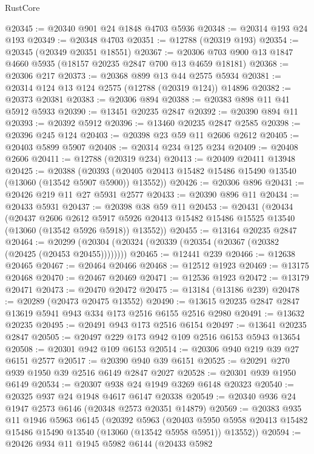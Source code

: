 \begin{lexlean}{RustCore}
\begin{coremodule}
@20345 := @20340 @901 @24 @1848 @4703 @5936
@20348 := @20314 @193 @24 @193
@20349 := @20348 @4703
@20351 := @12788 (@20319 @193)
@20354 := @20345 (@20349 @20351 @18551)
@20367 := @20306 @703 @900 @13 @1847 @4660 @5935 (@18157 @20235 @2847 @700 @13 @4659 @18181)
@20368 := @20306 @217
@20373 := @20368 @899 @13 @44 @2575 @5934
@20381 := @20314 @124 @13 @124 @2575 (@12788 (@20319 @124)) @14896
@20382 := @20373 @20381
@20383 := @20306 @894
@20388 := @20383 @898 @11 @41 @5912 @5933
@20390 := @13451 @20235 @2847
@20392 := @20390 @894 @11
@20393 := @20392 @5912
@20396 := @13460 @20235 @2847 @2585
@20398 := @20396 @245 @124
@20403 := @20398 @23 @59 @11 @2606 @2612
@20405 := @20403 @5899 @5907
@20408 := @20314 @234 @125 @234
@20409 := @20408 @2606
@20411 := @12788 (@20319 @234)
@20413 := @20409 @20411 @13948
@20425 := @20388
    (@20393 (@20405 @20413 @15482 @15486 @15490 @13540 (@13060 (@13542 @5907 @5900)) @13552))
@20426 := @20306 @896
@20431 := @20426 @219 @11 @27 @5931 @2577
@20433 := @20390 @896 @11
@20434 := @20433 @5931
@20437 := @20398 @38 @59 @11
@20453 := @20431
    (@20434
      (@20437
        @2606
        @2612
        @5917
        @5926
        @20413
        @15482
        @15486
        @15525
        @13540
        (@13060 (@13542 @5926 @5918))
        @13552))
@20455 := @13164 @20235 @2847
@20464 := @20299 (@20304 (@20324 (@20339 (@20354 (@20367 (@20382 (@20425 (@20453 @20455))))))))
@20465 := @12441 @239
@20466 := @12638 @20465
@20467 := @20464 @20466
@20468 := @12512 @1923
@20469 := @13175 @20468
@20470 := @20467 @20469
@20471 := @12536 @1923
@20472 := @13179 @20471
@20473 := @20470 @20472
@20475 := @13184 (@13186 @239)
@20478 := @20289 (@20473 @20475 @13552)
@20490 := @13615 @20235 @2847 @2847 @13619 @5941 @943 @334 @173 @2516 @6155 @2516 @2980
@20491 := @13632 @20235
@20495 := @20491 @943 @173 @2516 @6154
@20497 := @13641 @20235 @2847
@20505 := @20497 @229 @173 @942 @109 @2516 @6153 @5943 @13654
@20508 := @20301 @942 @109 @6153
@20514 := @20306 @940 @219 @39 @27 @6151 @2577
@20517 := @20390 @940 @39 @6151
@20525 := @20291 @270 @939 @1950 @39 @2516 @6149 @2847 @2027
@20528 := @20301 @939 @1950 @6149
@20534 := @20307 @938 @24 @1949 @3269 @6148 @20323
@20540 := @20325 @937 @24 @1948 @4617 @6147 @20338
@20549 := @20340 @936 @24 @1947 @2573 @6146 (@20348 @2573 @20351 @14879)
@20569 := @20383
    @935
    @11
    @1946
    @5963
    @6145
    (@20392
      @5963
      (@20403 @5950 @5958 @20413 @15482 @15486 @15490 @13540 (@13060 (@13542 @5958 @5951)) @13552))
@20594 := @20426
    @934
    @11
    @1945
    @5982
    @6144
    (@20433
      @5982

\end{coremodule}
\end{lexlean}
